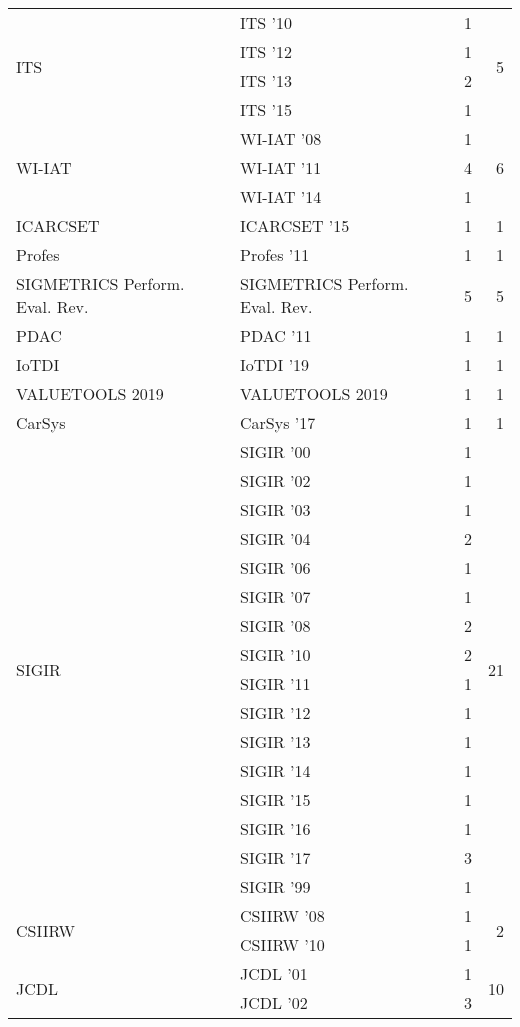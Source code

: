 \begin{table*}[t]
\begin{tabular}{llrr}
\multirow{4}{*}{ITS } & ITS '10 & 1 & \multirow{4}{*}{5}\\
& ITS '12 & 1 &\\
& ITS '13 & 2 &\\
& ITS '15 & 1 &\\
\multirow{3}{*}{WI-IAT } & WI-IAT '08 & 1 & \multirow{3}{*}{6}\\
& WI-IAT '11 & 4 &\\
& WI-IAT '14 & 1 &\\
\multirow{1}{*}{ICARCSET } & ICARCSET '15 & 1 & \multirow{1}{*}{1}\\
\multirow{1}{*}{Profes } & Profes '11 & 1 & \multirow{1}{*}{1}\\
\multirow{1}{*}{SIGMETRICS Perform. Eval. Rev.} & SIGMETRICS Perform. Eval. Rev. & 5 & \multirow{1}{*}{5}\\
\multirow{1}{*}{PDAC } & PDAC '11 & 1 & \multirow{1}{*}{1}\\
\multirow{1}{*}{IoTDI } & IoTDI '19 & 1 & \multirow{1}{*}{1}\\
\multirow{1}{*}{VALUETOOLS 2019} & VALUETOOLS 2019 & 1 & \multirow{1}{*}{1}\\
\multirow{1}{*}{CarSys } & CarSys '17 & 1 & \multirow{1}{*}{1}\\
\multirow{16}{*}{SIGIR } & SIGIR '00 & 1 & \multirow{16}{*}{21}\\
& SIGIR '02 & 1 &\\
& SIGIR '03 & 1 &\\
& SIGIR '04 & 2 &\\
& SIGIR '06 & 1 &\\
& SIGIR '07 & 1 &\\
& SIGIR '08 & 2 &\\
& SIGIR '10 & 2 &\\
& SIGIR '11 & 1 &\\
& SIGIR '12 & 1 &\\
& SIGIR '13 & 1 &\\
& SIGIR '14 & 1 &\\
& SIGIR '15 & 1 &\\
& SIGIR '16 & 1 &\\
& SIGIR '17 & 3 &\\
& SIGIR '99 & 1 &\\
\multirow{2}{*}{CSIIRW } & CSIIRW '08 & 1 & \multirow{2}{*}{2}\\
& CSIIRW '10 & 1 &\\
\multirow{7}{*}{JCDL } & JCDL '01 & 1 & \multirow{7}{*}{10}\\
& JCDL '02 & 3 &\\

\end{tabular}
\end{table*}
